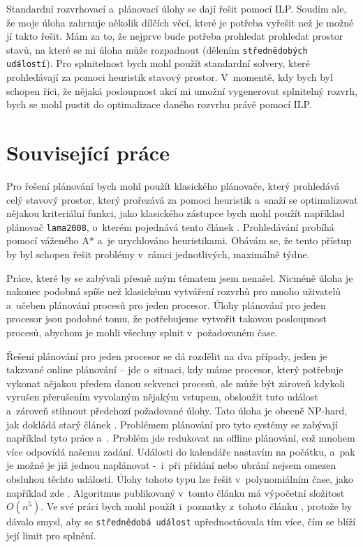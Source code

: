 \documentclass[a4paper,11pt]{article}
\begin{document}
Standardní rozvrhovací a~plánovací úlohy se dají řešit pomocí ILP. Soudím ale, že moje úloha zahrnuje několik dílčích věcí, které je potřeba vyřešit než je možné jí takto řešit. Mám za to, že nejprve bude potřeba prohledat prohledat prostor stavů, na které se mi úloha může rozpadnout (dělením \texttt{střednědobých událostí}). Pro splnitelnost bych mohl použít standardní solvery, které prohledávají za pomoci heuristik stavový prostor. V~momentě, kdy bych byl schopen říci, že nějaká posloupnost akcí mi umožní vygenerovat splnitelný rozvrh, bych se mohl pustit do optimalizace daného rozvrhu právě pomocí ILP.

\section*{Související práce}
Pro řešení plánování bych mohl použít klasického plánovače, který prohledává celý stavový prostor, který prořezává za pomoci heuristik a~snaží se optimalizovat nějakou kriteriální funkci, jako klasického zástupce bych mohl použít například plánovač \texttt{lama2008}, o~kterém pojednává tento článek \cite{richter2011lama}. Prohledávání probíhá pomocí váženého A* a~je urychlováno heuristikami. Obávám se, že tento přístup by byl schopen řešit problémy v~rámci jednotlivých, maximálně týdne.

Práce, které by se zabývali přesně mým tématem jsem nenašel. Nicméně úloha je nakonec podobná spíše než klasickému vytváření rozvrhů pro mnoho uživatelů a~učeben plánování procesů pro jeden procesor. Úlohy plánování pro jeden procesor jsou podobné tomu, že potřebujeme vytvořit takovou posloupnost procesů, abychom je mohli všechny splnit v~požadovaném čase.

Řešení plánování pro jeden procesor se dá rozdělit na dva případy, jeden je takzvané online plánování -- jde o~situaci, kdy máme procesor, který potřebuje vykonat nějakou předem danou sekvenci procesů, ale může být zároveň kdykoli vyrušen přerušením vyvolaným nějakým vstupem, obsloužit tuto událost a~zároveň stihnout předchozí požadované úlohy. Tato úloha je obecně NP-hard, jak dokládá starý článek \cite{Ullman:1975:NSP:1739944.1740138}. Problémem plánování pro tyto systémy se zabývají například tyto práce \cite{BrChGr13} a~\cite{Baruah}.
Problém jde redukovat na offline plánování, což mnohem více odpovídá našemu zadání. Události do kalendáře nastavím na počátku, a~pak je možné je již jednou naplánovat -~i~při přidání nebo ubrání nejsem omezen obsluhou těchto událostí. Úlohy tohoto typu lze řešit v~polynomiálním čase, jako například zde \cite{polyEnergy}. Algoritmus publikovaný v~tomto článku má výpočetní složitost $\mathit{O}(n^5)$. Ve své práci bych mohl použít i~poznatky z~tohoto článku \cite{Browne90schedulingdeteriorating}, protože by dávalo smysl, aby se \texttt{střednědobá událost} upřednostňovala tím více, čím se blíží její limit pro splnění.
\end{document}
